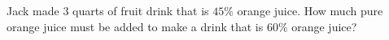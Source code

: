 Jack made $3$ quarts of fruit drink that is $45\%$ orange juice. How much pure orange juice must be added to make a drink that is $60\%$ orange juice?
